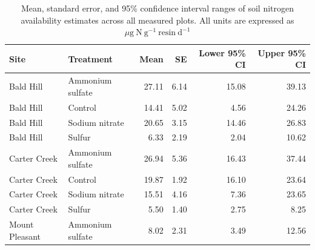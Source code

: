\newpage
\begin{landscape}
\begin{table}[]
    \caption{Mean, standard error, and 95\% confidence interval ranges of soil nitrogen availability estimates across all measured plots. All units are expressed as $\mu \mathrm{g\ N\ g^{-1}\ resin\ d^{-1}}$}
    \centering
    \label{tab:table.b4}
    \begin{tabular}{p{3cm}p{3.5cm}p{1.5cm}p{1.5cm}p{2.75cm}p{2.75cm}}
        \hline
        Site           & Treatment        & \multicolumn{1}{r}{Mean }   & \multicolumn{1}{r}{SE}    & \multicolumn{1}{r}{Lower 95\% CI} & \multicolumn{1}{r}{Upper 95\% CI} \\
        \hline
        Bald Hill      & Ammonium sulfate & \multicolumn{1}{r}{27.11}   & \multicolumn{1}{r}{6.14}  & \multicolumn{1}{r}{15.08}         & \multicolumn{1}{r}{39.13}  \\
        Bald Hill      & Control          & \multicolumn{1}{r}{14.41}   & \multicolumn{1}{r}{5.02}  & \multicolumn{1}{r}{4.56}          & \multicolumn{1}{r}{24.26}  \\
        Bald Hill      & Sodium nitrate   & \multicolumn{1}{r}{20.65}   & \multicolumn{1}{r}{3.15}  & \multicolumn{1}{r}{14.46}         & \multicolumn{1}{r}{26.83}  \\
        Bald Hill      & Sulfur           & \multicolumn{1}{r}{6.33}    & \multicolumn{1}{r}{2.19}  & \multicolumn{1}{r}{2.04}          & \multicolumn{1}{r}{10.62}  \\
        Carter Creek   & Ammonium sulfate & \multicolumn{1}{r}{26.94}   & \multicolumn{1}{r}{5.36}  & \multicolumn{1}{r}{16.43}         & \multicolumn{1}{r}{37.44}  \\
        Carter Creek   & Control          & \multicolumn{1}{r}{19.87}   & \multicolumn{1}{r}{1.92}  & \multicolumn{1}{r}{16.10}         & \multicolumn{1}{r}{23.64}  \\
        Carter Creek   & Sodium nitrate   & \multicolumn{1}{r}{15.51}   & \multicolumn{1}{r}{4.16}  & \multicolumn{1}{r}{7.36}          & \multicolumn{1}{r}{23.65}  \\
        Carter Creek   & Sulfur           & \multicolumn{1}{r}{5.50}    & \multicolumn{1}{r}{1.40}  & \multicolumn{1}{r}{2.75}          & \multicolumn{1}{r}{8.25}   \\
        Mount Pleasant & Ammonium sulfate & \multicolumn{1}{r}{8.02}    & \multicolumn{1}{r}{2.31}  & \multicolumn{1}{r}{3.49}          & \multicolumn{1}{r}{12.56}  \\

\end{tabular}
\end{table}
\end{landscape}
